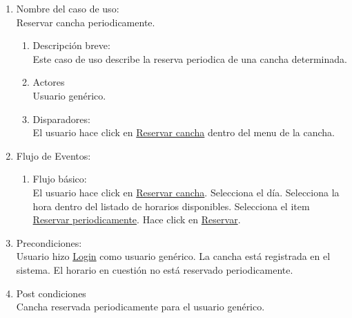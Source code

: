\documentclass[a4paper,11pt]{article}
\begin{document}
\begin{enumerate}

    \item Nombre del caso de uso: \\
    Reservar cancha periodicamente.

    \begin{enumerate}
    \item Descripción breve: \\
        Este caso de uso describe la reserva periodica de una cancha determinada.
    \item Actores \\
        Usuario genérico.
    \item Disparadores: \\
        El usuario hace click en \underline{Reservar cancha}
        dentro del menu de la cancha.
    \end{enumerate}

    \item Flujo de Eventos: \\

    \begin{enumerate}

        \item Flujo básico:\\
            El usuario hace click en \underline{Reservar cancha}.
            Selecciona el día.
            Selecciona la hora dentro del listado de horarios disponibles.
            Selecciona el item \underline{Reservar periodicamente}.
            Hace click en \underline{Reservar}.
    \end{enumerate}

    \item Precondiciones: \\
        Usuario hizo \underline{Login} como usuario genérico.
        La cancha está registrada en el sistema.
        El horario en cuestión no está reservado periodicamente.

    \item Post condiciones \\
        Cancha reservada periodicamente para el usuario genérico.

\end{enumerate}


\end{document}
